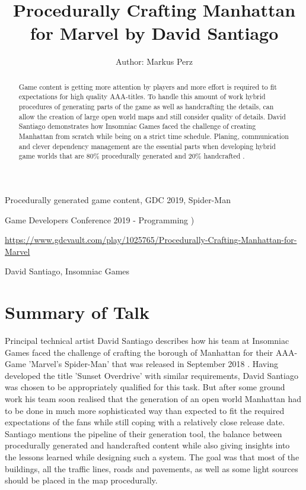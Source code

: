 \documentclass[a4paper]{article}
\title{Procedurally Crafting Manhattan for Marvel by David Santiago}
\author{Author: Markus Perz}
\begin{document}
\maketitle

\begin{keywords}Procedurally generated game content, GDC 2019, Spider-Man\end{keywords}

\begin{track} Game Developers Conference 2019 - Programming ) \end{track}

\begin{talkurl}  \url{https://www.gdcvault.com/play/1025765/Procedurally-Crafting-Manhattan-for-Marvel} \end{talkurl}

\begin{speaker}David Santiago, Insomniac Games\end{speaker}


\begin{abstract}

Game content is getting more attention by players and more effort is required to fit expectations for high quality AAA-titles. To handle this amount of work hybrid procedures of generating parts of the game as well as handcrafting the details, can allow the creation of large open world maps and still consider quality of details. David Santiago demonstrates how Insomniac Games faced the challenge of creating Manhattan from scratch while being on a strict time schedule. Planing, communication and clever dependency management are the essential parts when developing hybrid game worlds that are 80\% procedurally generated and 20\% handcrafted .

\end{abstract}

\section{Summary of Talk}

Principal technical artist David Santiago describes how his team at Insomniac Games faced the challenge of crafting the borough of Manhattan for their AAA-Game 'Marvel's Spider-Man' that was released in September 2018 .
Having developed the title 'Sunset Overdrive' with similar requirements, David Santiago was chosen to be appropriately qualified for this task.
But after some ground work his team soon realised that the generation of an open world Manhattan had to be done in much more sophisticated way than expected to fit the required expectations of the fans while still coping with a relatively close release date. Santiago mentions the pipeline of their generation tool, the balance between procedurally generated and handcrafted content while also giving insights into the lessons learned while designing such a system. The goal was that most of the buildings, all the traffic lines, roads and pavements, as well as some light sources should be placed in the map procedurally. 
\end{document}

